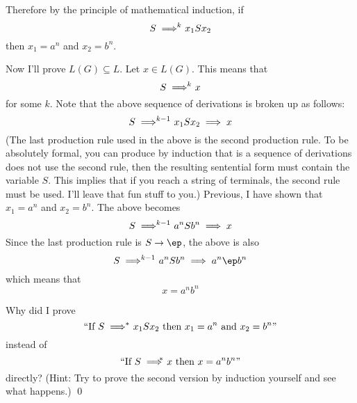 Therefore by the principle of mathematical induction, 
if 
\[
S \implies^{\hspace{-0.2cm} k}\  x_1 S x_2
\]
then $x_1 = a^n$ and $x_2 = b^n$.

Now I'll prove $L(G) \subseteq L$.
Let $x \in L(G)$.
This means that 
\[
S \implies^{\hspace{-0.2cm} k}\ x
\]
for some $k$.
Note that the above sequence of derivations is broken up as follows:
\[
S \implies^{\hspace{-0.2cm} k - 1}\ x_1 S x_2 \implies x
\]
(The last production rule used in the above is the second production rule.
To be absolutely formal, you can produce by induction
that is a sequence of derivations does not use the second rule,
then the resulting sentential form must contain the variable $S$.
This implies that if you reach a string of terminals, the second rule
must be used. I'll leave that fun stuff to you.)
Previous, I have shown that $x_1 = a^n$ and $x_2 = b^n$.
The above becomes
\[
S \implies^{\hspace{-0.2cm} k - 1} \ a^n S b^n \implies x
\]
Since the last production rule is $S \rightarrow \ep$, the above is also
\[
S \implies^{\hspace{-0.2cm} k - 1} \ a^n S b^n \implies a^n \ep b^n
\]
which means that 
\[
x = a^n b^n
\]

\newpage
\begin{ex}
Why did I prove 
\[
\text{
\lq\lq If $S \implies^{\hspace{-0,2cm} *}\ x_1S x_2$ then $x_1 = a^n$ and $x_2 = b^n$'' 
}
\]
instead of 
\[
\text{
\lq\lq If $S \implies^{\hspace{-0.3cm} *}\ x$ then $x = a^nb^n$''
}
\] 
directly? 
(Hint: Try to prove the second version by induction yourself
and see what happens.)
\qed
\end{ex}
